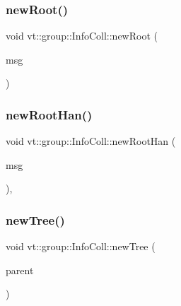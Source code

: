 \mbox{\label{structvt_1_1group_1_1_info_coll_a9d6575ca76673103be0c4960c818a892}} 
\subsubsection{\texorpdfstring{new\+Root()}{newRoot()}}
{\footnotesize\ttfamily void vt\+::group\+::\+Info\+Coll\+::new\+Root (\begin{DoxyParamCaption}\item[{\hyperlink{namespacevt_1_1group_a4c1183efe0185992fefb3ab38a55a8a7}{Group\+Collective\+Msg} $\ast$}]{msg }\end{DoxyParamCaption})\hspace{0.3cm}{\ttfamily [private]}}

\mbox{\label{structvt_1_1group_1_1_info_coll_a1c37f69107e014a3aef10346e5ebe0c7}} 
\subsubsection{\texorpdfstring{new\+Root\+Han()}{newRootHan()}}
{\footnotesize\ttfamily void vt\+::group\+::\+Info\+Coll\+::new\+Root\+Han (\begin{DoxyParamCaption}\item[{\hyperlink{namespacevt_1_1group_a4c1183efe0185992fefb3ab38a55a8a7}{Group\+Collective\+Msg} $\ast$}]{msg }\end{DoxyParamCaption})\hspace{0.3cm}{\ttfamily [static]}, {\ttfamily [protected]}}

\mbox{\label{structvt_1_1group_1_1_info_coll_aea685940e7c9f1e18d55bfab07e31445}} 
\subsubsection{\texorpdfstring{new\+Tree()}{newTree()}}
{\footnotesize\ttfamily void vt\+::group\+::\+Info\+Coll\+::new\+Tree (\begin{DoxyParamCaption}\item[{\hyperlink{namespacevt_a866da9d0efc19c0a1ce79e9e492f47e2}{Node\+Type} const \&}]{parent }\end{DoxyParamCaption})\hspace{0.3cm}{\ttfamily [private]}}

